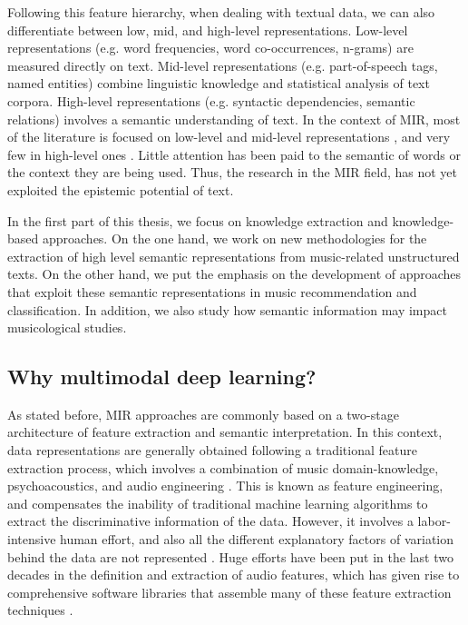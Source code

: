 Following this feature hierarchy, when dealing with textual data, we can also differentiate between low, mid, and high-level representations. Low-level representations (e.g. word frequencies, word co-occurrences, n-grams) are measured directly on text. Mid-level representations (e.g. part-of-speech tags, named entities) combine linguistic knowledge and statistical analysis of text corpora. High-level representations (e.g. syntactic dependencies, semantic relations) involves a semantic understanding of text. In the context of MIR, most of the literature is focused on low-level and mid-level representations \citep{Celma2006,lamere2008social,Whitman2002,Knees2013}, and very few in high-level ones \citep{Tata2010,Knees2011,Sordo2012}. Little attention has been paid to the semantic of words or the context they are being used. Thus, the research in the MIR field, has not yet exploited the epistemic potential of text.

In the first part of this thesis, we focus on knowledge extraction and knowledge-based approaches. On the one hand, we work on new methodologies for the extraction of high level semantic representations from music-related unstructured texts. On the other hand, we put the emphasis on the development of approaches that exploit these semantic representations in music recommendation and classification. In addition, we also study how semantic information may impact musicological studies.

\subsection{Why multimodal deep learning?}
\label{sec:intro:learning}

As stated before, MIR approaches are commonly based on a two-stage architecture of feature extraction and semantic interpretation. In this context, data representations are generally obtained following a traditional feature extraction process, which involves a combination of music domain-knowledge, psychoacoustics, and audio engineering \citep{humphrey2012}. 
This is known as feature engineering, and compensates the inability of traditional machine learning algorithms to extract the discriminative information of the data. However, it involves a labor-intensive human effort, and also all the different explanatory factors of variation behind the data are not represented \citep{bengio2013representation}. 
Huge efforts have been put in the last two decades in the definition and extraction of audio features, which has given rise to comprehensive software libraries that assemble many of these feature extraction techniques \citep{bogdanov2013essentia, Mcfee2015}. 

